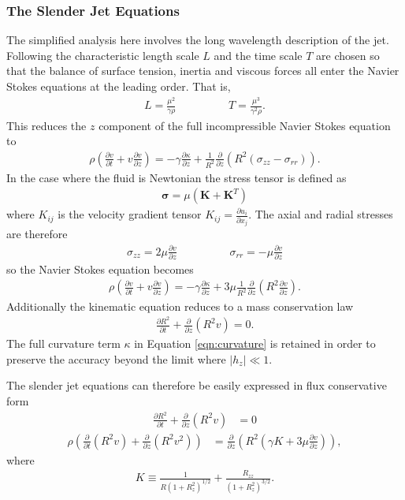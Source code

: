 \documentclass[11pt]{article}
\newcommand{\pd}[2]{\frac{\partial #1}{\partial #2}}
\begin{document}
\subsubsection{The Slender Jet Equations} \label{sec:slender}
The simplified analysis here involves the long wavelength description of the 
jet. Following \cite{eggers2008physics} the characteristic length scale $L$ and 
the time scale $T$ are chosen so that the balance of surface tension, inertia 
and viscous forces all enter the Navier Stokes equations at the leading order. 
That is,
\begin{align*}
L = \frac{\mu^2}{\gamma \rho} \hspace{2cm} T = \frac{\mu^3}{\gamma^2 \rho}.
\end{align*}
This reduces the $z$ component of the full incompressible Navier Stokes 
equation to
\begin{align*}
\rho \left( \pd{v}{t} + v \pd{v}{z} \right) = -\gamma \pd{\kappa}{z} + \frac{1}{R^2} 
\pd{}{z} \left(R^2 (\sigma_{zz} - \sigma_{rr}) \right).
\end{align*}
In the case where the fluid is Newtonian the stress tensor is defined as
\begin{align*}
\mathbf{\sigma} = \mu (\mathbf{K} + \mathbf{K}^T)
\end{align*}
where $K_{ij}$ is the velocity gradient tensor $K_{ij} = \pd{u_i}{x_j}$. The 
axial and radial stresses are therefore
\begin{align*}
\sigma_{zz} = 2\mu \pd{v}{z} \hspace{2cm} \sigma_{rr} = -\mu \pd{v}{z}
\end{align*}
so the Navier Stokes equation becomes
\begin{align*}
\rho \left( \pd{v}{t} + v \pd{v}{z} \right) = - \gamma \pd{\kappa}{z} + 3 \mu 
\frac{1}{R^2} \pd{}{z} \left(R^2 \pd{v}{z} \right).
\end{align*}
Additionally the kinematic equation reduces to a mass conservation law
\begin{align*}
\pd{R^2}{t} + \pd{}{z}(R^2 v) = 0.
\end{align*}
The full curvature term $\kappa$ in Equation \ref{eqn:curvature} is retained in 
order to preserve the accuracy beyond the limit where $|h_z| \ll 1$.

The slender jet equations can therefore be easily expressed in flux 
conservative form
\begin{align}
\pd{R^2}{t} + \pd{}{z} (R^2v) &= 0 \label{eqn:mass_con}
\end{align}
\begin{align}
\rho \left( \pd{}{t} (R^2v) + \pd{}{z} (R^2v^2) \right) &= \pd{}{z} \left(R^2 
\left( \gamma K + 3 \mu \pd{v}{z}\right) \right), \label{eqn:mom_con}
\end{align}
where
\begin{align*}
K \equiv \frac{1}{R(1+R_z^2)^{1/2}} + \frac{R_{zz}}{(1 + R_z^2)^{3/2}}.
\end{align*}
\end{document}
